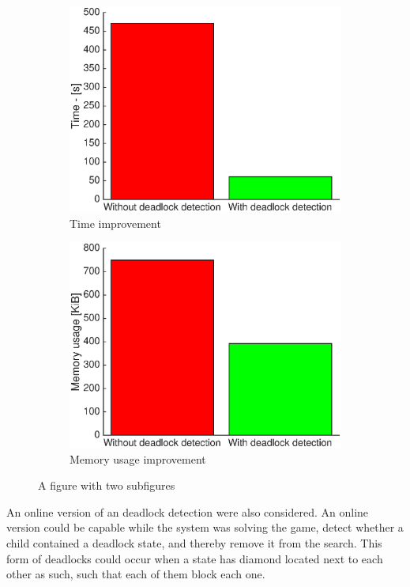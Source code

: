  
 \begin{figure}[H]
\centering
\begin{subfigure}{.5\textwidth}
  \centering
  \includegraphics[width=0.98\linewidth]{images/deadlockImprovement}
  \caption{Time improvement}
  \label{fig:sub1}
\end{subfigure}%
\begin{subfigure}{.5\textwidth}
  \centering
  \includegraphics[width=0.99\linewidth]{images/Memory_usage_1}
  \caption{Memory usage improvement}
  \label{fig:sub2}
\end{subfigure}
\caption{A figure with two subfigures}
\label{fig:test}
\end{figure}
 
An online version of an deadlock detection were also considered.  An online version could be capable while the system was solving the game, detect whether a child contained a deadlock state, and thereby remove it from the search.  This form of deadlocks could occur when a state has diamond located next to each other as such, such that each of them block each one. \\

